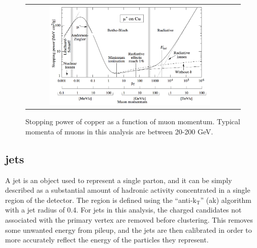 
\begin{figure}[!ht]
\begin{center}
\begin{tabular}{cc}
\includegraphics[width=0.8\textwidth]{cms/figs/muon_energy_loss.png}
\end{tabular}
\caption{ Stopping power of copper as a function of muon momentum. Typical momenta of muons in this analysis are between 20-200 GeV. 
\label{fig:muonenergyloss}
}
\end{center}
\end{figure}


\subsection{jets}
\label{ssec:jets}
A jet is an object used to represent a single parton, and it can be simply described as a substantial amount of hadronic activity concentrated in a single region of the detector.
The region is defined using the ``anti-$\mathrm{k_{T}}$'' (ak) algorithm~\cite{antikt} with a jet radius of 0.4.
For jets in this analysis, the charged candidates not associated with the primary vertex are removed before clustering. 
This removes some unwanted energy from pileup, and the jets are then calibrated in order to more accurately reflect the energy of the particles they represent.

